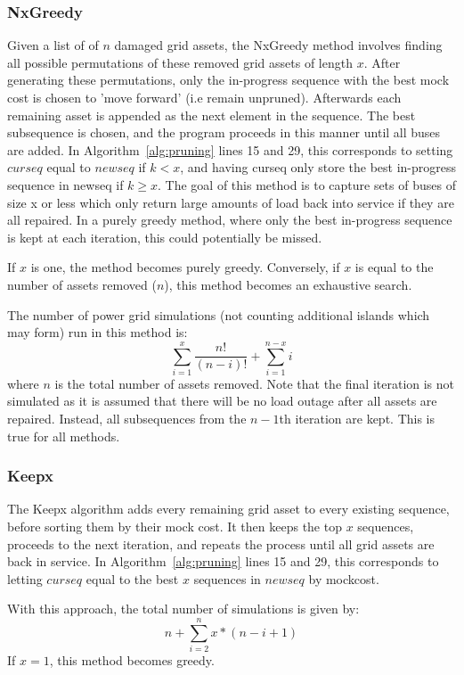\documentclass[12pt]{article}
\begin{document}
\subsubsection{NxGreedy}\label{nxgreedy}
Given a list of of $n$ damaged grid assets, the NxGreedy method involves finding all possible permutations of these removed grid assets of length $x$. After generating these permutations, only the in-progress sequence with the best mock cost is chosen to ’move forward’ (i.e remain unpruned). Afterwards each remaining asset is appended as the next element in the sequence. The best subsequence is chosen, and the program proceeds in this manner until all buses are added. In Algorithm~\ref{alg:pruning} lines 15 and 29, this corresponds to setting $curseq$ equal to $newseq$ if $k < x$, and having curseq only store the best in-progress sequence in newseq if $ k \geq x$. The goal of this method is to capture sets of buses of size x or less which only return large amounts of load back into service if they are all repaired. In a purely greedy method, where only the best in-progress sequence is kept at each iteration, this could potentially be missed. \par
If $x$ is one, the method becomes purely greedy. Conversely, if $x$ is equal to the number of assets removed ($n$), this method becomes an exhaustive search.\par
The number of power grid simulations (not counting additional islands which may form) run in this method is:
\begin{equation} 
    \sum_{i=1}^{x}\frac{n!}{(n-i)!} + \sum_{i=1}^{n-x}i
    \label{eq:NxGreedysims}
\end{equation}
where $n$ is the total number of assets removed. Note that the final iteration is not simulated as it is assumed that there will be no load outage after all assets are repaired. Instead, all subsequences from the $n-1$th iteration are kept. This is true for all methods.
\subsubsection{Keepx}
The Keepx algorithm adds every remaining grid asset to every existing sequence, before sorting them by their mock cost. It then keeps the top $x$ sequences, proceeds to the next iteration, and repeats the process until all grid assets are back in service. In Algorithm~\ref{alg:pruning} lines 15 and 29, this corresponds to letting $curseq$ equal to the best $x$ sequences in $newseq$ by mockcost. \par
With this approach, the total number of simulations is given by:
\begin{equation} 
    n + \sum_{i=2}^{n}x*(n-i+1)
    \label{eq:Keepxsims}
\end{equation}
If $x = 1$, this method becomes greedy.
\end{document}
